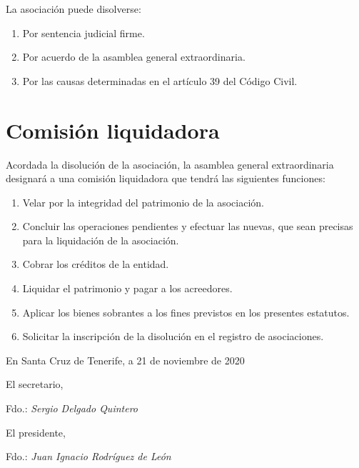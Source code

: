 \documentclass[a4paper, 12pt, oneside]{book}
\begin{document}
La asociación puede disolverse:

\begin{enumerate}
    \item Por sentencia judicial firme.  
    \item Por acuerdo de la asamblea general extraordinaria.  
    \item Por las causas determinadas en el artículo 39 del Código Civil.
\end{enumerate}

\section{Comisión liquidadora}

Acordada la disolución de la asociación, la asamblea general extraordinaria designará a una comisión liquidadora que tendrá las siguientes funciones:

\begin{enumerate}
    \item Velar por la integridad del patrimonio de la asociación.  
    \item Concluir las operaciones pendientes y efectuar las nuevas, que sean precisas para la liquidación de la asociación.  
    \item Cobrar los créditos de la entidad.  
    \item Liquidar el patrimonio y pagar a los acreedores.  
    \item Aplicar los bienes sobrantes a los fines previstos en los presentes estatutos.  
    \item Solicitar la inscripción de la disolución en el registro de asociaciones.
\end{enumerate}

\begin{flushright}
    En Santa Cruz de Tenerife, a 21 de noviembre de 2020
\end{flushright}

\vspace{15mm}

\begin{multicols}{2}
    \noindent
    El secretario,

    \vspace{25mm}

    \noindent
    Fdo.: \textit{Sergio Delgado Quintero}

    \vfill\null
    \columnbreak
    \begin{flushright}
        El presidente,
    
        \vspace{25mm}
    
        \noindent
        Fdo.: \textit{Juan Ignacio Rodríguez de León}
    \end{flushright}
\end{multicols}
\end{document}

